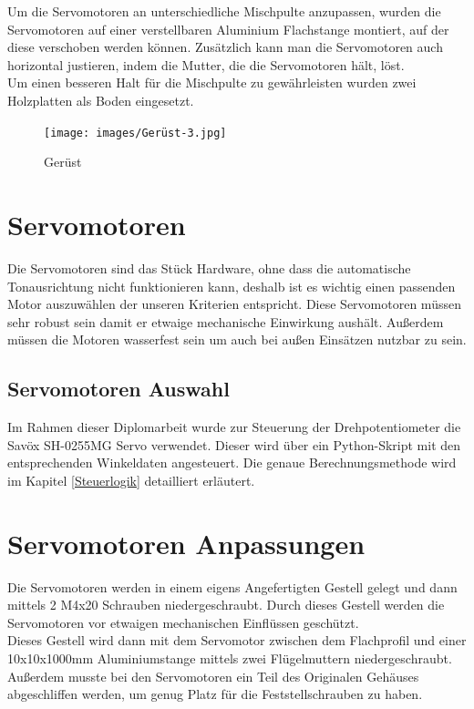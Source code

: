 Um die Servomotoren an unterschiedliche Mischpulte anzupassen, wurden die Servomotoren auf einer verstellbaren Aluminium Flachstange montiert, auf der diese verschoben werden können. Zusätzlich kann man die Servomotoren auch horizontal justieren, indem die Mutter, die die Servomotoren hält, löst. \\
Um einen besseren Halt für die Mischpulte zu gewährleisten wurden zwei Holzplatten als Boden eingesetzt.

\begin{figure}[H]
	\centering
	\texttt{[image: images/Gerüst-3.jpg]}
	\caption[Gerüst]{Gerüst}
	\label{fig:Gerüst-2}
\end{figure}


\section{Servomotoren}
Die Servomotoren sind das Stück Hardware, ohne dass die automatische Tonausrichtung nicht funktionieren kann, deshalb ist es wichtig einen passenden Motor auszuwählen der unseren Kriterien entspricht. Diese Servomotoren müssen sehr robust sein damit er etwaige mechanische Einwirkung aushält. Außerdem müssen die Motoren wasserfest sein um auch bei außen Einsätzen nutzbar zu sein. 

\subsection{Servomotoren Auswahl}

Im Rahmen dieser Diplomarbeit wurde zur Steuerung der Drehpotentiometer die Savöx SH-0255MG Servo verwendet. Dieser wird über ein Python-Skript mit den entsprechenden Winkeldaten angesteuert. Die genaue Berechnungsmethode wird im Kapitel \ref{Steuerlogik} detailliert erläutert.

\section{Servomotoren Anpassungen}
Die Servomotoren werden in einem eigens Angefertigten Gestell gelegt und dann mittels 2 M4x20 Schrauben niedergeschraubt. Durch dieses Gestell werden die Servomotoren vor etwaigen mechanischen Einflüssen geschützt. \\
Dieses Gestell wird dann mit dem Servomotor zwischen dem Flachprofil und einer 10x10x1000mm Aluminiumstange mittels zwei Flügelmuttern niedergeschraubt.\\
Außerdem musste bei den Servomotoren ein Teil des Originalen Gehäuses abgeschliffen werden, um genug Platz für die Feststellschrauben zu haben.

